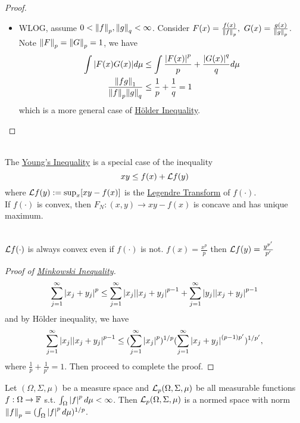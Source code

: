 \begin{remark}
\begin{proof}
\begin{itemize}
\begin{equation*}
    \end{equation*}
    which is known as \underline{Yound's Inequality}.
    \item WLOG, assume $0 < \norm{f}_p, \norm{g}_q < \infty$. Consider $F(x) = \frac{f(x)}{\norm{f}_p},\ G(x) = \frac{g(x)}{\norm{g}_p}$. Note $\norm{F}_p = \norm{G}_p = 1$, we have
    \begin{align*}
        \int \abs{F(x) G(x)} d\mu &\leq \int \frac{\abs{F(x)}^p}{p} + \frac{\abs{G(x)}^q}{q} d\mu\\
        \frac{\norm{fg}_1}{\norm{f}_p \norm{g}_q} &\leq \frac{1}{p} + \frac{1}{q} = 1
    \end{align*}
    which is a more general case of \underline{H\"older Inequality}. 
\end{itemize}
\end{proof}
\begin{remark}\ \\
    The \underline{Young's Inequality} is a special case of the inequality $$xy \leq f(x) + \mathcal{L} f(y)$$
where $\mathcal{L} f(y) := \sup_x [xy - f(x)]$ is the \underline{Legendre Transform} of $f(\cdot)$.\\
If $f(\cdot)$ is convex, then $F_N: (x,y) \to xy - f(x)$ is concave and has unique maximum.
\end{remark}
\begin{remark}\ \\
    $\mathcal{L} f(\cdot)$ is always convex even if $f(\cdot)$ is not. $f(x) = \frac{x^p}{p}$ then $\mathcal{L} f(y) = \frac{y^{p'}}{p'}$
\end{remark}
\begin{proof}[Proof of \underline{Minkowski Inequality}]\
\begin{equation*}
    \sum_{j = 1}^\infty \abs{x_j + y_j}^p \leq \sum_{j=1}^\infty \abs{x_j} \abs{x_j + y_j}^{p-1} + \sum_{j= 1}^\infty \abs{y_j} \abs{x_j + y_j}^{p-1}
\end{equation*}
and by H\"older inequality, we have 
\begin{equation*}
    \sum_{j = 1}^\infty \abs{x_j} \abs{x_j + y_j}^{p-1} \leq (\sum_{j= 1}^\infty  \abs{x_j}^p)^{1/p} (\sum_{j = 1}^\infty \abs{x_j + y_j}^{(p - 1) p'})^{1 /p'},
\end{equation*}
where $\frac{1}{p} + \frac{1}{p'} = 1$. Then proceed to complete the proof.
\end{proof}
\end{remark}

\np Let $(\Omega, \Sigma,\mu)$ be a measure space and $\mathcal{L}_p(\Omega, \Sigma, \mu)$ be all measurable functions $f: \Omega \to \mathbb{F}$ s.t. $\int_\Omega \abs{f}^p \,d\mu < \infty$. Then $\mathcal{L}_p (\Omega, \Sigma, \mu)$ is a normed space with norm $\norm{f}_p = (\int_\Omega \abs{f}^p \,d\mu)^{1/p}$.

